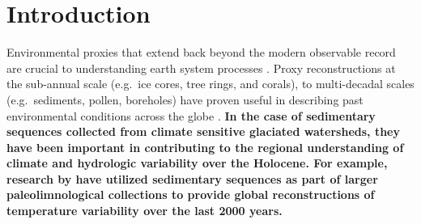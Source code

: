 \documentclass[Royal,times,doublespace,sageh]{sagej}
\begin{document}
\maketitle

\hypertarget{introduction}{%
\section{Introduction}\label{introduction}}

Environmental proxies that extend back beyond the modern observable
record are crucial to understanding earth system processes
\citep{Turney2019, Huber2012, Nelson2016}. Proxy reconstructions at the
sub-annual scale (e.g.~ice cores, tree rings, and corals), to
multi-decadal scales (e.g.~sediments, pollen, boreholes) have proven
useful in describing past environmental conditions across the globe
\citep{Masson2013}. \textbf{In the case of sedimentary sequences
collected from climate sensitive glaciated watersheds, they have been
important in contributing to the regional understanding of climate and
hydrologic variability over the Holocene. For example, research by
\citet{Neukom2019} have utilized sedimentary sequences as part of larger
paleolimnological collections to provide global reconstructions of
temperature variability over the last 2000 years. }
\end{document}
